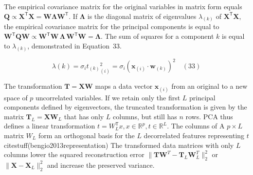 \documentclass[preprint,12pt]{elsarticle}
\begin{document}
The empirical covariance matrix for the original variables in matrix form equals $\mathbf{Q} \propto \mathbf{X}^{\mathsf{T}}\mathbf{X} =\mathbf{W} \mathbf{\Lambda} \mathbf{W}^{\mathsf{T}}$. If $\mathbf{\Lambda}$ is the diagonal matrix of eigenvalues $\lambda_{\left(k\right)}$ of $\mathbf{X}^{\mathsf{T}}\mathbf{X}$, the empirical covariance matrix for the principal components is equal to $\mathbf{W}^{\mathsf{T}}\mathbf{Q} \mathbf{W} \propto \mathbf{W}^{\mathsf{T}}\mathbf{W} \,\mathbf{\Lambda} \,\mathbf{W}^{\mathsf{T}}\mathbf{W} =\mathbf{\Lambda}$. The sum of squares for a component $k$ is equal to $\lambda_{\left(k\right)}$, demonstrated in Equation~33.

\begin{equation}
	\lambda(k) = \sigma_{i} {t_{\left(k\right)}}^{2}_{\left(i\right)} = \sigma_{i} {\left(\mathbf{x}_{\left(i\right)} \cdot \mathbf{w}_{\left(k\right)}\right)}^{2}
	\quad\left(33\right)
\end{equation}

The transformation $\mathbf{T} = \mathbf{X} \mathbf{W}$ maps a data vector $\mathbf{x}_{\left(i\right)}$ from an original to a new space of $p$ uncorrelated variables. If we retain only the first $L$ principal components defined by eigenvectors, the truncated transformation is given by the matrix $\mathbf{T}_{L}=\mathbf{X} \mathbf{W}_{L}$ that has only $L$ columns, but still has $n$ rows. PCA thus defines a linear transformation $t=W_{L}^{\mathsf{T}}x,x\in \mathbb{R}^{p},t\in \mathbb{R}^{L}$. The columns of A $p \times L$ matrix $W_{L}$ form an orthogonal basis for the $L$ decorrelated features representing $t$ citestuff(bengio2013representation) The transformed data matrices with only $L$ columns lower the squared reconstruction error $\|\mathbf{T} \mathbf{W}^{T}-\mathbf{T}_{L}\mathbf{W}_{L}^{T}\|_{2}^{2}$ or  $\|\mathbf{X} -\mathbf{X}_{L}\|_{2}^{2}$ and increase the preserved variance.
\end{document}
